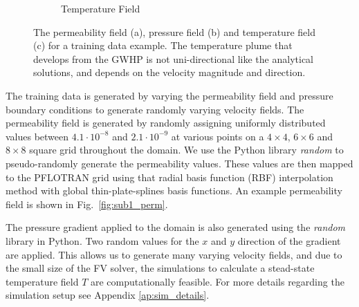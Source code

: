 \documentclass{article} %
\begin{document}
\begin{figure}[!htb]
\begin{subfigure}{.33\textwidth}
  \caption{Temperature Field}
  \label{fig:sub1_temp}
\end{subfigure}%
\caption{The permeability field (a), pressure field (b) and temperature field (c) for a training data example. The temperature plume that develops from the GWHP is not uni-directional like the analytical solutions, and depends on the velocity magnitude and direction.}
\label{fig:data_example}
\end{figure}




The training data is generated by varying the permeability field and pressure boundary conditions to generate randomly varying velocity fields.
The permeability field is generated by randomly assigning uniformly distributed values between $4.1 \cdot 10^{-8}$ and $2.1 \cdot 10^{-9}$ at various points on a $4 \times 4$, $6 \times 6$ and $8 \times 8$ square grid throughout the domain. We use the Python library \textit{random} to pseudo-randomly generate the permeability values. These values are then mapped to the PFLOTRAN grid using that radial basis function (RBF) interpolation method with global thin-plate-splines basis functions.
An example permeability field is shown in Fig.~\ref{fig:sub1_perm}.

The pressure gradient applied to the domain is also generated using the \textit{random} library in Python. Two random values for the $x$ and $y$ direction of the gradient are applied.
This allows us to generate many varying velocity fields, and due to the small size of the FV solver, the simulations to calculate a stead-state temperature field $T$ are computationally feasible.
For more details regarding the simulation setup see Appendix \ref{ap:sim_details}.
\end{document}
